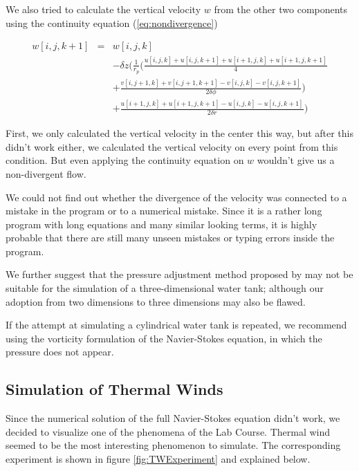 \documentclass[12pt, a4paper]{article} %
\begin{document}
			We also tried to calculate the vertical velocity $w$ from the other two components using the continuity equation (\ref{eq:nondivergence})
			
			\begin{eqnarray}
				w[i,j,k+1] &=& w[i,j,k]
				\nonumber \\
				&&- \delta z \Bigg( \frac{1}{r_p}\bigg( \frac{u[i,j,k]+u[i,j,k+1]+u[i+1,j,k]+u[i+1,j,k+1]}{4}
				\nonumber \\
				&&+ \frac{v[i,j+1,k]+v[i,j+1,k+1]-v[i,j,k]-v[i,j,k+1]}{2\delta\phi} \bigg) 
				\nonumber \\
				&&+\frac{u[i+1,j,k]+u[i+1,j,k+1]-u[i,j,k]-u[i,j,k+1]}{2\delta r} \Bigg)
				\label{eq: neues w_c}
			\end{eqnarray}
			
			First, we only calculated the vertical velocity in the center this way, but after this didn't work either, we calculated the vertical velocity on every point from this condition. But even applying the continuity equation on $w$ wouldn't give us a non-divergent flow.
			
			We could not find out whether the divergence of the velocity was connected to a mistake in the program or to a numerical mistake. Since it is a rather long program with long equations and many similar looking terms, it is highly probable that there are still many unseen mistakes or typing errors inside the program.
			
			We further suggest that the pressure adjustment method proposed by \citet{Schmittfull2005} may not be suitable for the simulation of a three-dimensional water tank; although our adoption from two dimensions to three dimensions may also be flawed.
			
			If the attempt at simulating a cylindrical water tank is repeated, we recommend using the vorticity formulation of the Navier-Stokes equation, in which the pressure does not appear.
			
			\newpage
			
	\subsection{Simulation of Thermal Winds}
		Since the numerical solution of the full Navier-Stokes equation didn't work, we decided to visualize one of the phenomena of the Lab Course. Thermal wind seemed to be the most interesting phenomenon to simulate. The corresponding experiment is shown in figure \ref{fig:TWExperiment} and explained below.
		
\end{document}
